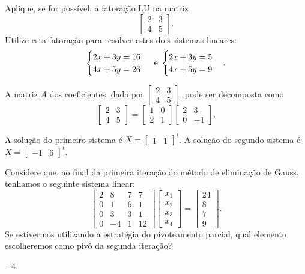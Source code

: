 \begin{ex}
Aplique, se for possível, a fatoração LU na matriz
$$\begin{bmatrix}
2&3\\
4&5
\end{bmatrix}.$$
Utilize esta fatoração para resolver estes dois sistemas lineares:
$$\begin{cases}
2x+3y=16\\
4x+5y=26
\end{cases}\textnormal{ e }
\begin{cases}
2x+3y=5\\
4x+5y=9
\end{cases}.$$
\begin{sol}
A matriz $A$ dos coeficientes, dada por $\begin{bmatrix}
2&3\\4&5
\end{bmatrix}$, pode ser decomposta como
$$\begin{bmatrix}
2&3\\4&5
\end{bmatrix}=\begin{bmatrix}
1&0\\2&1
\end{bmatrix}\begin{bmatrix}
2&3\\0&-1
\end{bmatrix}.$$

A solução do primeiro sistema é $X=\begin{bmatrix}
1&1
\end{bmatrix}^t$. A solução do segundo sistema é $X=\begin{bmatrix}
-1&6
\end{bmatrix}^t$.
\end{sol}
\end{ex}

\begin{ex}
Considere que, ao final da primeira iteração do método de eliminação de Gauss, tenhamos o seguinte sistema linear:
$$\begin{bmatrix}
2	&8	&7	&7	\\
0	&1	&6	&1	\\
0	&3	&3	&1	\\
0	&-4	&1	&12	
\end{bmatrix}
\begin{bmatrix}
x_1\\
x_2\\
x_3\\
x_4
\end{bmatrix}=
\begin{bmatrix}
24\\8\\7\\9
\end{bmatrix}.$$
Se estivermos utilizando a estratégia do pivoteamento parcial, qual elemento escolheremos como pivô da segunda iteração?
\begin{sol}
$-4$.
\end{sol}
\end{ex}


